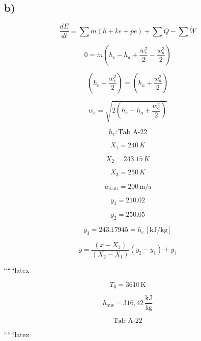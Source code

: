 

\subsection*{b)}

\[
\frac{dE}{dt} = \sum \dot{m} (h + ke + pe) + \sum \dot{Q} - \sum \dot{W}
\]

\[
0 = \dot{m} \left( h_e - h_a + \frac{w_e^2}{2} - \frac{w_a^2}{2} \right)
\]

\[
\left( h_e + \frac{w_e^2}{2} \right) = \left( h_a + \frac{w_a^2}{2} \right)
\]

\[
w_e = \sqrt{2 \left( h_e - h_a + \frac{w_a^2}{2} \right)}
\]

\[
h_e: \text{Tab A-22}
\]

\[
X_1 = 240 \, K
\]

\[
X_2 = 243.15 \, K
\]

\[
X_3 = 250 \, K
\]

\[
w_{\text{Luft}} = 200 \, \text{m/s}
\]

\[
y_1 = 210.02
\]

\[
y_2 = 250.05
\]

\[
y_3 = 243.17945 = h_e \, [\text{kJ/kg}]
\]

\[
y = \frac{(x - X_1)}{(X_2 - X_1)} (y_2 - y_1) + y_1
\]

``````latex


\[
T_6 = 3610 \, \text{K}
\]

\[
h_{\text{aus}} = 316,42 \, \frac{\text{kJ}}{\text{kg}}
\]

\[
\text{Tab A-22}
\]

``````latex